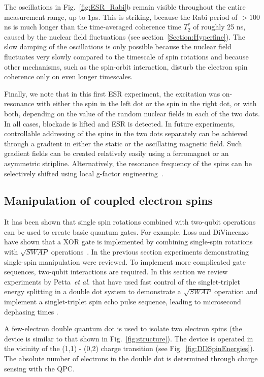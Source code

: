\documentclass[rmp,twocolumn,aps]{revtex4}
\begin{document}
The oscillations in Fig.~\ref{fig:ESR_Rabi}b remain visible
throughout the entire measurement range, up to $1 \mu$s. This is
striking, because the Rabi period of $> 100$ ns is much
longer than the time-averaged coherence time $T_2^*$ of roughly 25
ns, caused by the nuclear field fluctuations (see
section~\ref{Section:Hyperfine}). The slow damping of the
oscillations is only possible because the nuclear field fluctuates
very slowly compared to the timescale of spin rotations and
because other mechanisms, such as the spin-orbit interaction,
disturb the electron spin coherence only on even longer
timescales.

Finally, we note that in this first ESR experiment, the excitation
was on-resonance with either the spin in the left dot or the spin
in the right dot, or with both, depending on the value of the
random nuclear fields in each of the two dots. In all cases,
blockade is lifted and ESR is detected. In future experiments,
controllable addressing of the spins in the two dots separately
can be achieved through a gradient in either the static or the
oscillating magnetic field. Such gradient fields can be created
relatively easily using a ferromagnet or an asymmetric stripline.
Alternatively, the resonance frequency of the spins can be
selectively shifted using local g-factor
engineering~\cite{salis01,jiang01}.

\subsection{Manipulation of coupled electron spins}
\label{Section:Coherent:TwoSpin} It has been shown that single spin
rotations combined with two-qubit operations can be used to create
basic quantum gates. For example, Loss and DiVincenzo have shown
that a XOR gate is implemented by combining single-spin rotations
with $\sqrt{SWAP}$ operations~\cite{LossDiVincenzo}. In the previous
section experiments demonstrating single-spin manipulation were
reviewed. To implement more complicated gate sequences, two-qubit
interactions are required. In this section we review experiments by Petta~\textit{et al.} that have used fast control of the singlet-triplet energy splitting in a double dot system to demonstrate a
$\sqrt{SWAP}$ operation and implement a singlet-triplet spin echo
pulse sequence, leading to microsecond dephasing times
\cite{petta05}.

A few-electron double quantum dot is used to isolate two electron
spins (the device is similar to that shown in Fig.~\ref{fig:structure}). The device is operated in the vicinity of the
(1,1) - (0,2) charge transition (see Fig.~\ref{fig:DDSpinEnergies}). The absolute number of electrons
in the double dot is determined through charge sensing with the QPC.
\end{document}
